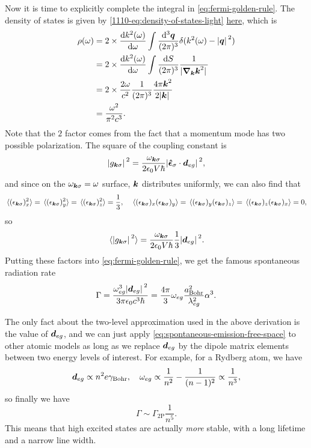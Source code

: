 \documentclass[hyperref, a4paper]{article}
\begin{document}
Now it is time to explicitly complete the integral in \eqref{eq:fermi-golden-rule}. 
The density of states is given by \eqref{1110-eq:density-of-states-light}  
\href{../advanced-electrodynamics/lecture-11-10.pdf}{here}, which is 
\[
    \begin{aligned}
        \rho(\omega) &= 2 \times  \dv{k^2(\omega)}{\omega} \int \frac{\dd[3]{\vb*{q}}}{(2\pi)^3} \delta(k^2(\omega) - \abs*{\vb*{q}}^2) \\ 
        &= 2 \times \dv{k^2(\omega)}{\omega} \int \frac{\dd{S}}{(2\pi)^3} \frac{1}{\abs*{\grad_{\vb*{k}} \vb*{k}^2 }} \\
        &= 2 \times \frac{2 \omega}{c^2} \frac{1}{(2\pi)^3} \frac{4 \pi \vb*{k}^2}{2 \abs*{\vb*{k}}} \\
        &= \frac{\omega^2}{\pi^2 c^3} .
    \end{aligned}
\]
Note that the $2$ factor comes from the fact that a momentum mode has two possible polarization.
The square of the coupling constant is 
\begin{equation}
    \abs*{g_{\vb*{k} \sigma}}^2 = \frac{\omega_{\vb*{k} \sigma}}{2 \epsilon_0 V \hbar} \abs*{\vu*{\epsilon}_{\sigma} \cdot \vb*{d}_{eg}}^2,
\end{equation}
and since on the $\omega_{\vb*{k} \sigma} = \omega$ surface, $\vb*{k}$ distributes uniformly, we can also 
find that 
\[
    \expval*{(\epsilon_{\vb*{k} \sigma})_x^2} = \expval*{(\epsilon_{\vb*{k} \sigma})_y^2} = \expval*{(\epsilon_{\vb*{k} \sigma})_z^2} = \frac{1}{3}, \quad 
    \expval*{(\epsilon_{\vb*{k} \sigma})_x (\epsilon_{\vb*{k} \sigma})_y} = 
    \expval*{(\epsilon_{\vb*{k} \sigma})_y (\epsilon_{\vb*{k} \sigma})_z} = 
    \expval*{(\epsilon_{\vb*{k} \sigma})_z (\epsilon_{\vb*{k} \sigma})_x} = 0,
\]
so 
\[
    \expval*{\abs*{g_{\vb*{k} \sigma}}^2} = \frac{\omega_{\vb*{k} \sigma}}{2 \epsilon_0 V \hbar} \frac{1}{3} \abs*{\vb*{d}_{eg}}^2.
\]
Putting these factors into \eqref{eq:fermi-golden-rule}, we get the famous spontaneous radiation rate
\begin{equation}
    \Gamma = \frac{\omega_{eg}^3 \abs*{\vb*{d}_{eg}}^2 }{3 \pi \epsilon_0 c^3 \hbar} 
    = \frac{4 \pi}{3} \omega_{eg} \frac{a_\text{Bohr}^2}{\lambda_{eg}^2} \alpha^3.
    \label{eq:spontaneous-emission-free-space}
\end{equation}

The only fact about the two-level approximation used in the above derivation is the value of $\vb*{d}_{eg}$, 
and we can just apply \eqref{eq:spontaneous-emission-free-space} to other atomic models as long as we replace 
$\vb*{d}_{eg}$ by the dipole matrix elements between two energy levels of interest. For example, for a 
Rydberg atom, we have 
\begin{equation}
    \vb*{d}_{eg} \propto n^2 e \gamma_\text{Bohr}, 
    \quad \omega_{eg} \propto \frac{1}{n^2} - \frac{1}{(n-1)^2} \propto \frac{1}{n^3},
\end{equation}
so finally we have 
\begin{equation}
    \Gamma \sim \Gamma_{2 \text{P}} \frac{1}{n^5}.
\end{equation}
This means that high excited states are actually \emph{more} stable, with a long lifetime and a narrow line width.
\end{document}
